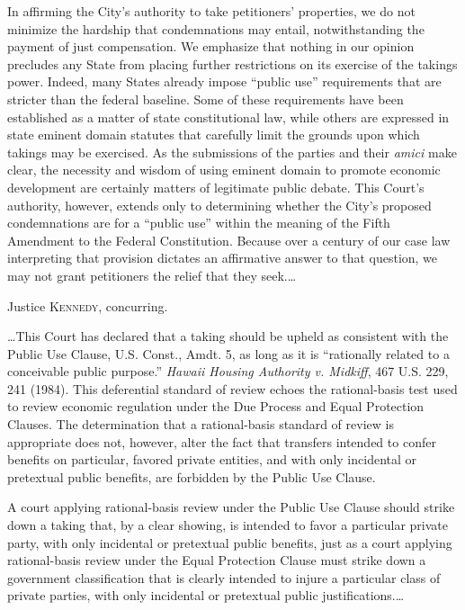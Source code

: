 In affirming the City's authority to take petitioners' properties, we do not
minimize the hardship that condemnations may entail, notwithstanding the payment
of just compensation. We emphasize that nothing in our opinion precludes any
State from placing further restrictions on its exercise of the takings power.
Indeed, many States already impose ``public use'' requirements that are stricter
than the federal baseline. Some of these requirements have been established as a
matter of state constitutional law, while others are expressed in state eminent
domain statutes that carefully limit the grounds upon which takings may be
exercised. As the submissions of the parties and their \textit{amici} make
clear, the necessity and wisdom of using eminent domain to promote economic
development are certainly matters of legitimate public debate. This Court's
authority, however, extends only to determining whether the City's proposed
condemnations are for a ``public use'' within the meaning of the Fifth Amendment
to the Federal Constitution. Because over a century of our case law interpreting
that provision dictates an affirmative answer to that question, we may not grant
petitioners the relief that they seek.\ldots

\opinion Justice \textsc{Kennedy}, concurring.

\ldots This Court has declared that a taking should be upheld as consistent with
the Public Use Clause, U.S. Const., Amdt. 5, as long as it is ``rationally
related to a conceivable public purpose.'' \textit{Hawaii Housing Authority v.
Midkiff}, 467 U.S. 229, 241 (1984). This deferential standard of review echoes
the rational-basis test used to review economic regulation under the Due Process
and Equal Protection Clauses. The determination that a rational-basis standard
of review is appropriate does not, however, alter the fact that transfers
intended to confer benefits on particular, favored private entities, and with
only incidental or pretextual public benefits, are forbidden by the Public Use
Clause.

A court applying rational-basis review under the Public Use Clause should strike
down a taking that, by a clear showing, is intended to favor a particular
private party, with only incidental or pretextual public benefits, just as a
court applying rational-basis review under the Equal Protection Clause must
strike down a government classification that is clearly intended to injure a
particular class of private parties, with only incidental or pretextual public
justifications.\ldots

